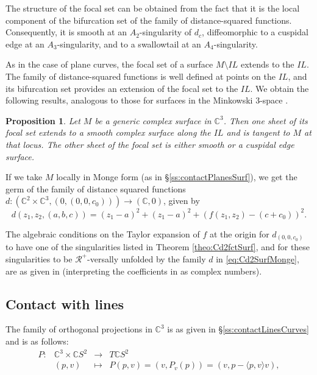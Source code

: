 \documentclass[12pt,a4paper]{article}
\newtheorem{prop}{Proposition}[section]
\begin{document}
The structure of the focal set can be obtained from the fact that it is the local component of the bifurcation set of the family of distance-squared functions. Consequently, it is smooth at an $A_2$-singularity of $d_c$, diffeomorphic to a cuspidal edge at an $A_3$-singularity, and to a swallowtail at an $A_4$-singularity. 

As in the case of plane curves, the focal set of a surface $M\setminus IL$ extends to the $IL$. The family of distance-squared functions is well defined at points on the $IL$, and its bifurcation set provides an extension of the focal set to the $IL$. We obtain the following results, analogous to those for surfaces in the Minkowski 3-space \cite{causticsR31}.

\begin{prop}
Let $M$ be a generic complex surface in $\mathbb{C}^{3}$. Then one sheet of its focal set extends to a smooth complex surface along the $IL$ and is tangent to $M$ at that locus. The other sheet of the focal set is either smooth or a cuspidal edge surface.
\end{prop}



If we take $M$ locally  in Monge form (as in \S\ref{ss:contactPlanesSurf}),
we get the germ of the family of distance squared functions
$d:(\mathbb C^2\times   \mathbb C^3,(0,(0,0,c_0)))\to (\mathbb C,0)$, given by
\begin{equation}\label{eq:Cd2SurfMonge}
	d(z_1,z_2,(a,b,c))=(z_1-a)^2+(z_1-a)^2+(f(z_1,z_2)-(c+c_0))^2.
\end{equation}

The algebraic conditions on the Taylor expansion of $f$ at the origin for $d_{(0,0,c_0)}$ to have one of the singularities listed in Theorem \ref{theo:Cd2fctSurf}, and for these singularities to be $\mathcal R^+$-versally unfolded by the family $d$ in \eqref{eq:Cd2SurfMonge}, are as given in \cite[Chapter 6]{IRRT} (interpreting the coefficients in  \cite{IRRT} as complex numbers).

\subsection{Contact with lines}\label{ss:contactLinesSurf}

The family of orthogonal projections in $\mathbb C^3$ is as given in \S\ref{ss:contactLinesCurves} and is as follows:
$$
\begin{array}{cccl}
	P:&\mathbb C^3\times \mathbb CS^2&\to& T\mathbb CS^2\\
	&(p,v)&\mapsto&P(p,v)=(v,P_v(p))=(v, p-\langle p,{v}\rangle v),
\end{array}
$$
\end{document}

